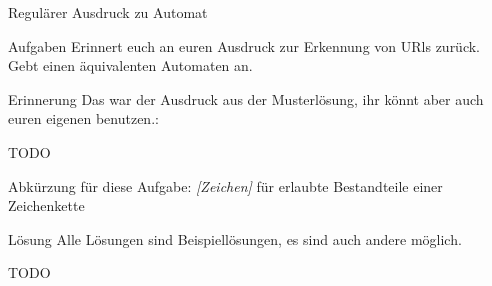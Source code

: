 {
	\begin{frame}{Regulärer Ausdruck zu Automat}
		\begin{alertblock}{Aufgaben}
			Erinnert euch an euren Ausdruck zur Erkennung von URls zurück. Gebt einen äquivalenten Automaten an.
		\end{alertblock}
		\begin{exampleblock}{Erinnerung}
			Das war der Ausdruck aus der Musterlösung, ihr könnt aber auch euren eigenen benutzen.:
			
			TODO
			
		\end{exampleblock}
		\footnotesize{Abkürzung für diese Aufgabe: \emph{[Zeichen]} für erlaubte Bestandteile einer Zeichenkette}
	\end{frame}
}

{
	\begin{frame}{Lösung}
		Alle Lösungen sind Beispiellösungen, es sind auch andere möglich.
		
		TODO
		
	\end{frame}
}
